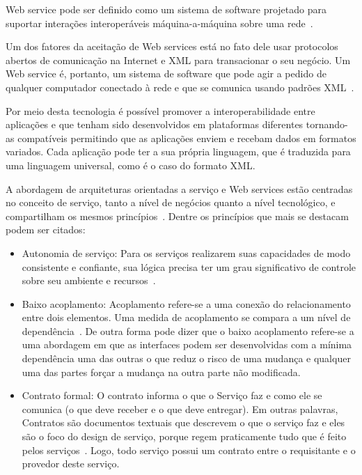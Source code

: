 Web service pode ser definido como um sistema de software projetado para suportar interações interoperáveis máquina-a-máquina sobre uma rede~\cite{Booth2004}.

Um dos fatores da aceitação de Web services está no fato dele usar protocolos abertos de comunicação na Internet e XML para transacionar o seu negócio. Um Web service é, portanto, um sistema de software que pode agir a pedido de qualquer computador conectado à rede e que se comunica usando padrões XML~\cite{Pulier2005}.

Por meio desta tecnologia é possível promover a interoperabilidade entre aplicações e que tenham sido desenvolvidos em plataformas diferentes tornando-as compatíveis permitindo que as aplicações enviem e recebam dados em formatos variados. Cada aplicação pode ter a sua própria linguagem, que é traduzida para uma linguagem universal, como é o caso do formato XML.

A abordagem de arquiteturas orientadas a serviço e Web services estão centradas no conceito de serviço, tanto a nível de negócios  quanto a nível tecnológico, e compartilham os mesmos princípios~\cite{Bertino2010}. Dentre os princípios que mais se destacam podem ser citados:

\begin{itemize}
    \item Autonomia de serviço: Para os serviços realizarem suas capacidades de modo consistente e confiante, sua lógica precisa ter um grau significativo de controle sobre seu ambiente e recursos~\cite{ERL09}.

    \item Baixo acoplamento: Acoplamento refere-se a uma conexão do relacionamento entre dois elementos. Uma medida de acoplamento se compara a um nível de dependência~\cite{ERL09}. De outra forma pode dizer que o baixo acoplamento refere-se a uma abordagem em que as interfaces podem ser desenvolvidas com a mínima dependência uma das outras o que reduz o risco  de uma mudança e qualquer uma das partes forçar a mudança na outra parte não modificada.

    \item Contrato formal: O contrato informa o que o Serviço faz e como ele se comunica (o que deve receber e o que deve entregar). Em outras palavras, Contratos são documentos textuais que descrevem o que o serviço faz e eles são o foco do design de serviço, porque regem praticamente tudo que é feito pelos serviços~\cite{ERL09}. Logo, todo serviço possui um contrato entre o requisitante e o provedor deste serviço.

\end{itemize}

